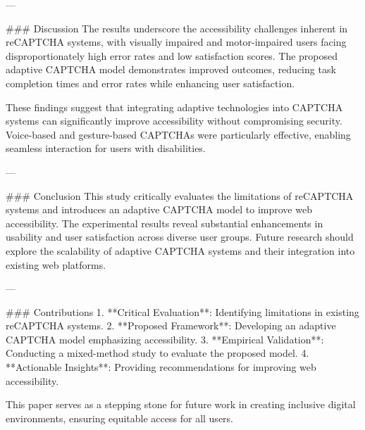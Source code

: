---

### Discussion  
The results underscore the accessibility challenges inherent in reCAPTCHA systems, with visually impaired and motor-impaired users facing disproportionately high error rates and low satisfaction scores. The proposed adaptive CAPTCHA model demonstrates improved outcomes, reducing task completion times and error rates while enhancing user satisfaction.

These findings suggest that integrating adaptive technologies into CAPTCHA systems can significantly improve accessibility without compromising security. Voice-based and gesture-based CAPTCHAs were particularly effective, enabling seamless interaction for users with disabilities.

---

### Conclusion  
This study critically evaluates the limitations of reCAPTCHA systems and introduces an adaptive CAPTCHA model to improve web accessibility. The experimental results reveal substantial enhancements in usability and user satisfaction across diverse user groups. Future research should explore the scalability of adaptive CAPTCHA systems and their integration into existing web platforms.

---

### Contributions  
1. **Critical Evaluation**: Identifying limitations in existing reCAPTCHA systems.  
2. **Proposed Framework**: Developing an adaptive CAPTCHA model emphasizing accessibility.  
3. **Empirical Validation**: Conducting a mixed-method study to evaluate the proposed model.  
4. **Actionable Insights**: Providing recommendations for improving web accessibility.  

This paper serves as a stepping stone for future work in creating inclusive digital environments, ensuring equitable access for all users.